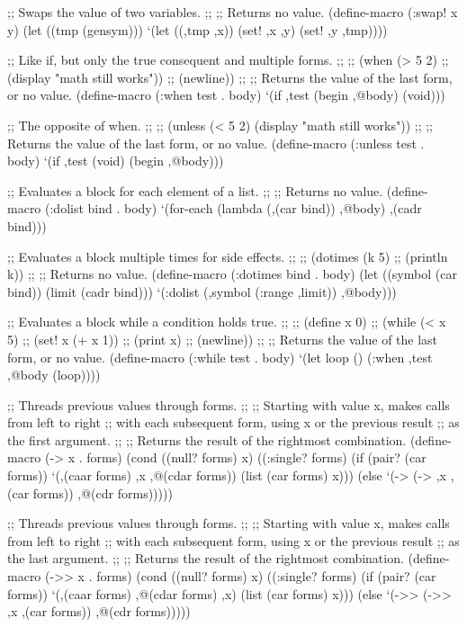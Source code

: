 ;; Swaps the value of two variables.
;;
;; Returns no value.
(define-macro (:swap! x y)
  (let ((tmp (gensym)))
    `(let ((,tmp ,x))
       (set! ,x ,y)
       (set! ,y ,tmp))))


;; Like if, but only the true consequent and multiple forms.
;;
;; (when (> 5 2)
;;   (display "math still works"))
;;   (newline))
;;
;; Returns the value of the last form, or no value.
(define-macro (:when test . body)
  `(if ,test (begin ,@body) (void)))


;; The opposite of when.
;;
;; (unless (< 5 2) (display "math still works"))
;;
;; Returns the value of the last form, or no value.
(define-macro (:unless test . body)
  `(if ,test (void) (begin ,@body)))


;; Evaluates a block for each element of a list.
;;
;; Returns no value.
(define-macro (:dolist bind . body)
  `(for-each
     (lambda (,(car bind)) ,@body)
     ,(cadr bind)))

;; Evaluates a block multiple times for side effects.
;;
;; (dotimes (k 5)
;;   (println k))
;;
;; Returns no value.
(define-macro (:dotimes bind . body)
  (let ((symbol (car bind))
        (limit (cadr bind)))
    `(:dolist (,symbol (:range ,limit)) ,@body)))


;; Evaluates a block while a condition holds true.
;;
;; (define x 0)
;; (while (< x 5)
;;   (set! x (+ x 1))
;;   (print x)
;;   (newline))
;;
;; Returns the value of the last form, or no value.
(define-macro (:while test . body)
  `(let loop ()
     (:when ,test
       ,@body 
       (loop))))


;; Threads previous values through forms.
;;
;; Starting with value x, makes calls from left to right
;; with each subsequent form, using x or the previous result
;; as the first argument.
;;
;; Returns the result of the rightmost combination.
(define-macro (-> x . forms)
  (cond ((null? forms) 
           x)
        ((:single? forms) 
           (if (pair? (car forms))
             `(,(caar forms) ,x ,@(cdar forms))
             (list (car forms) x)))
        (else 
           `(-> (-> ,x ,(car forms)) ,@(cdr forms)))))


;; Threads previous values through forms.
;;
;; Starting with value x, makes calls from left to right
;; with each subsequent form, using x or the previous result
;; as the last argument.
;;
;; Returns the result of the rightmost combination.
(define-macro (->> x . forms)
  (cond ((null? forms) 
           x)
        ((:single? forms) 
           (if (pair? (car forms))
             `(,(caar forms) ,@(cdar forms) ,x)
             (list (car forms) x)))
        (else 
           `(->> (->> ,x ,(car forms)) ,@(cdr forms)))))


